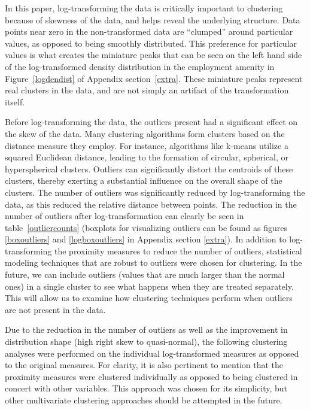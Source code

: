 \documentclass[11pt, a4paper]{article}
\begin{document}
In this paper, log-transforming the data is critically important to clustering because of skewness of the data, and helps reveal the underlying structure. Data points near zero in the non-transformed data are ``clumped'' around particular values, as opposed to being smoothly distributed. This preference for particular values is what creates the miniature peaks that can be seen on the left hand side of the log-transformed density distribution in the employment amenity in Figure~\ref{logdendist} of Appendix section~\ref{extra}. These miniature peaks represent real clusters in the data, and are not simply an artifact of the transformation itself.
\par
Before log-transforming the data, the outliers present had a significant effect on the skew of the data. Many clustering algorithms form clusters based on the distance measure they employ. For instance, algorithms like k-means utilize a squared Euclidean distance, leading to the formation of circular, spherical, or hyperspherical clusters. Outliers can significantly distort the centroids of these clusters, thereby exerting a substantial influence on the overall shape of the clusters. The number of outliers was significantly reduced by log-transforming the data, as this reduced the relative distance between points. The reduction in the number of outliers after log-transformation can clearly be seen in table~\ref{outliercounts} (boxplots for visualizing outliers can be found as figures \ref{boxoutliers} and \ref{logboxoutliers} in Appendix section \ref{extra}). In addition to log-transforming the proximity measures to reduce the number of outliers, statistical modeling techniques that are robust to outliers were chosen for clustering. In the future, we can include outliers (values that are much larger than the normal ones) in a single cluster to see what happens when they are treated separately. This will allow us to examine how clustering techniques perform when outliers are not present in the data.
\par
Due to the reduction in the number of outliers as well as the improvement in distribution shape (high right skew to quasi-normal), the following clustering analyses were performed on the individual log-transformed measures as opposed to the original measures. For clarity, it is also pertinent to mention that the proximity measures were clustered individually as opposed to being clustered in concert with other variables. This approach was chosen for its simplicity, but other multivariate clustering approaches should be attempted in the future.
\end{document}
